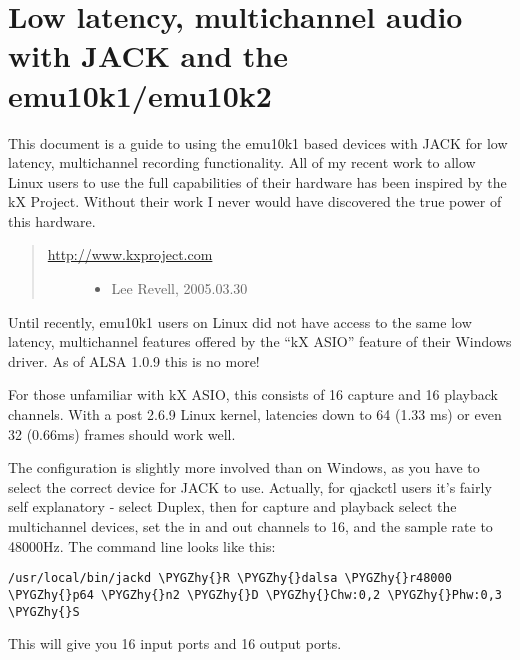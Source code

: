 \documentclass[a4paper,8pt,english]{sphinxmanual}
\def\PYGZhy{\char`\-}
\begin{document}
\section{Low latency, multichannel audio with JACK and the emu10k1/emu10k2}
\label{sound/cards/emu10k1-jack:low-latency-multichannel-audio-with-jack-and-the-emu10k1-emu10k2}\label{sound/cards/emu10k1-jack::doc}
This document is a guide to using the emu10k1 based devices with JACK for low
latency, multichannel recording functionality.  All of my recent work to allow
Linux users to use the full capabilities of their hardware has been inspired
by the kX Project.  Without their work I never would have discovered the true
power of this hardware.
\begin{quote}
\begin{description}
\item[{\href{http://www.kxproject.com}{http://www.kxproject.com}}] \leavevmode\begin{itemize}
\item {} 
Lee Revell, 2005.03.30

\end{itemize}

\end{description}
\end{quote}

Until recently, emu10k1 users on Linux did not have access to the same low
latency, multichannel features offered by the ``kX ASIO'' feature of their
Windows driver.  As of ALSA 1.0.9 this is no more!

For those unfamiliar with kX ASIO, this consists of 16 capture and 16 playback
channels.  With a post 2.6.9 Linux kernel, latencies down to 64 (1.33 ms) or
even 32 (0.66ms) frames should work well.

The configuration is slightly more involved than on Windows, as you have to
select the correct device for JACK to use.  Actually, for qjackctl users it's
fairly self explanatory - select Duplex, then for capture and playback select
the multichannel devices, set the in and out channels to 16, and the sample
rate to 48000Hz.  The command line looks like this:

\begin{Verbatim}[commandchars=\\\{\}]
/usr/local/bin/jackd \PYGZhy{}R \PYGZhy{}dalsa \PYGZhy{}r48000 \PYGZhy{}p64 \PYGZhy{}n2 \PYGZhy{}D \PYGZhy{}Chw:0,2 \PYGZhy{}Phw:0,3 \PYGZhy{}S
\end{Verbatim}

This will give you 16 input ports and 16 output ports.
\end{document}
